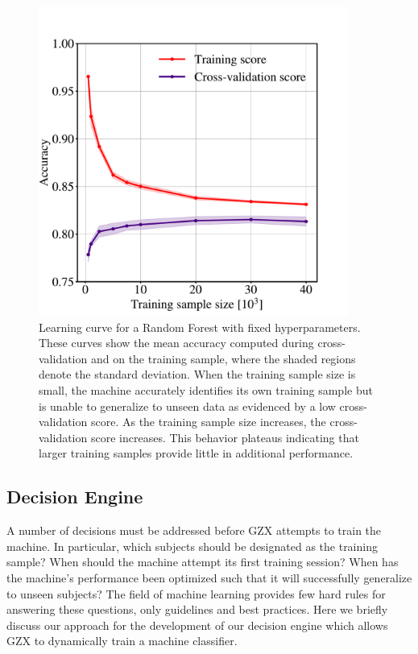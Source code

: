 \begin{figure}[t!]
\centering
\includegraphics[width=4in]{Figures/human_machine/f9.pdf}
\caption[Random Forest learning curve]{Learning curve for a Random Forest with fixed hyperparameters. These curves show the mean accuracy computed during cross-validation and on the training sample, where the shaded regions denote the standard deviation. When the training sample size is small, the machine accurately identifies its own training sample but is unable to generalize to unseen data as evidenced by a low cross-validation score. As the training sample size increases, the cross-validation score increases. This behavior plateaus indicating that larger training samples provide little in additional performance. \label{fig: learning curve}}
\end{figure}


\subsection{Decision Engine}\label{chap4: decision engine}
A number of decisions must be addressed before GZX attempts to train the machine.
In particular, which subjects should be designated as the training sample? When should the machine attempt its first training session? When has the machine's performance been optimized such that it will successfully generalize to unseen subjects? The field of machine learning provides few hard rules for answering these questions, only guidelines and best practices. Here we briefly discuss our approach for the development of our decision engine which allows GZX to dynamically train a machine classifier.


